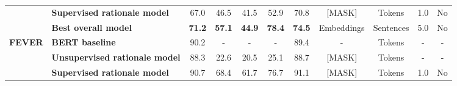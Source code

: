 \begin{table*}[]
\begin{tabular}{@{}llccccccccc@{}}
                                  & \textbf{Supervised rationale model}                        & 67.0                           & 46.5                  & 41.5                  & 52.9                  & 70.8                                                                                  & [MASK]                               & Tokens                                   & \multicolumn{1}{r}{1.0}                                               & \multicolumn{1}{r}{No}                                                    \\
                                  & \textbf{Best overall model}                         & \textbf{71.2}                  & \textbf{57.1}                  & \textbf{44.9}                  & \textbf{78.4}                  & \textbf{74.5}                                                                                  & Embeddings                           & Sentences                                & \multicolumn{1}{r}{5.0}                                               & \multicolumn{1}{r}{No}                                                    \\ \midrule
\multirow{4}{*}{\textbf{FEVER}}   & \textbf{BERT baseline}                              & 90.2                           & \multicolumn{1}{c}{-} & \multicolumn{1}{c}{-} & \multicolumn{1}{c}{-} & 89.4                                                                                  & \multicolumn{1}{c}{-}                & Tokens                                   & -                                                                     & -                                                                         \\
                                  & \textbf{Unsupervised rationale model}                      & 88.3                           & 22.6                  & 20.5                  & 25.1                  & 88.7                                                                                  & [MASK]                               & Tokens                                   & -                                                                     & -                                                                         \\
                                  & \textbf{Supervised rationale model}                        & 90.7                           & 68.4                  & 61.7                  & 76.7                  & 91.1                                                                                  & [MASK]                               & Tokens                                   & \multicolumn{1}{r}{1.0}                                               & \multicolumn{1}{r}{No}                                                    \\

\end{tabular}
\end{table*}
